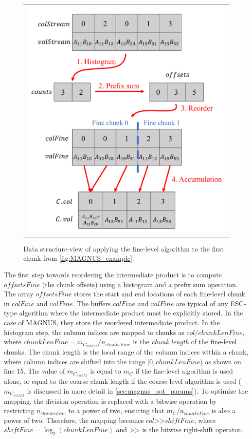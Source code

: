 \begin{figure}[htbp]
\centering
\begin{tabular}{c}
\includegraphics[width=0.61\linewidth]{figs/fineLevel.pdf} 
\end{tabular}
\caption{Data structure-view of applying the fine-level algorithm to the first chunk from \autoref{fig:MAGNUS_example}.}
\label{fig:fineLevel_example}
\end{figure}

The first step towards reordering the intermediate product is to compute $offsetsFine$ (the chunk offsets) using a histogram and a prefix sum operation.  
The array $offsetsFine$ stores the start and end locations of each fine-level chunk in $colFine$ and $valFine$.
The buffers $colFine$ and $valFine$ are typical of any ESC-type algorithm where the intermediate product must be explicitly stored.  In the case of MAGNUS, they store the reordered intermediate product.
In the histogram step, the column indices are mapped to chunks as $col / chunkLenFine$, where $chunkLenFine = m_{C_{maxL2}} / n_{chunksFine}$ is the \textit{chunk length} of the fine-level chunks.
The chunk length is the local range of the column indices within a chunk, where column indices are shifted into the range $[0,chunkLenFine)$ as shown on line 15.
The value of $m_{C_{maxL2}}$ is equal to $m_C$ if the fine-level algorithm is used alone, or equal to the coarse chunk length if the coarse-level algorithm is used ($m_{C_{maxL2}}$ is discussed in more detail in \autoref{sec:magnus_opt_params}).
To optimize the mapping, the division operation is replaced with a bitwise operation by restricting $n_{chunksFine}$ to a power of two, ensuring that $m_C / n_{chunksFine}$ is also a power of two.
Therefore, the mapping becomes $col \texttt{>>} shiftFine$, where $shiftFine = \log_2(chunkLenFine)$ and $\texttt{>>}$ is the bitwise right-shift operator.

